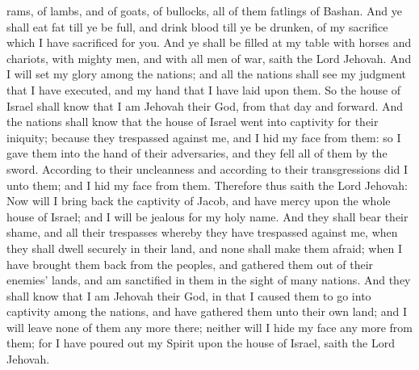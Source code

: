 rams, of lambs, and of goats, of bullocks, all of them fatlings of Bashan. And ye shall eat fat till ye be full, and drink blood till ye be drunken, of my sacrifice which I have sacrificed for you. And ye shall be filled at my table with horses and chariots, with mighty men, and with all men of war, saith the Lord Jehovah.  And I will set my glory among the nations; and all the nations shall see my judgment that I have executed, and my hand that I have laid upon them. So the house of Israel shall know that I am Jehovah their God, from that day and forward. And the nations shall know that the house of Israel went into captivity for their iniquity; because they trespassed against me, and I hid my face from them: so I gave them into the hand of their adversaries, and they fell all of them by the sword. According to their uncleanness and according to their transgressions did I unto them; and I hid my face from them.  Therefore thus saith the Lord Jehovah: Now will I bring back the captivity of Jacob, and have mercy upon the whole house of Israel; and I will be jealous for my holy name. And they shall bear their shame, and all their trespasses whereby they have trespassed against me, when they shall dwell securely in their land, and none shall make them afraid; when I have brought them back from the peoples, and gathered them out of their enemies’ lands, and am sanctified in them in the sight of many nations. And they shall know that I am Jehovah their God, in that I caused them to go into captivity among the nations, and have gathered them unto their own land; and I will leave none of them any more there; neither will I hide my face any more from them; for I have poured out my Spirit upon the house of Israel, saith the Lord Jehovah. 

